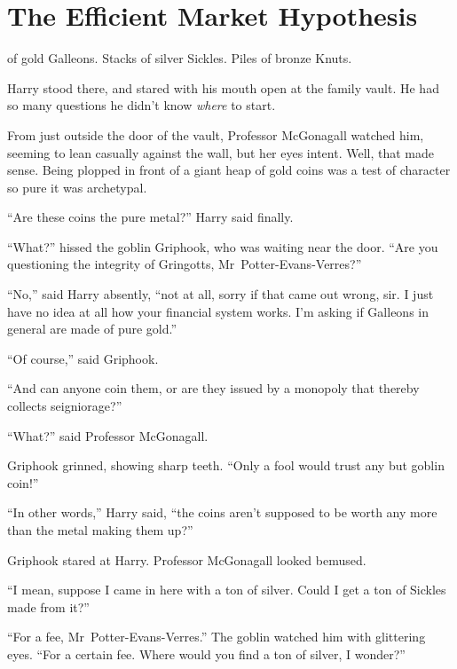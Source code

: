 \chapter[The Efficient Market Hypothesis]{The Efficient Market Hypothesis\protect\footnotemark}

 of gold Galleons. Stacks of silver Sickles. Piles of bronze Knuts.

\hplettrineextrapara
Harry stood there, and stared with his mouth open at the family vault. He had so many questions he didn’t know \emph{where} to start.

From just outside the door of the vault, Professor McGonagall watched him, seeming to lean casually against the wall, but her eyes intent. Well, that made sense. Being plopped in front of a giant heap of gold coins was a test of character so pure it was archetypal.

“Are these coins the pure metal?” Harry said finally.

“What?” hissed the goblin Griphook, who was waiting near the door. “Are you questioning the integrity of Gringotts, Mr~Potter-Evans-Verres?”

“No,” said Harry absently, “not at all, sorry if that came out wrong, sir. I just have no idea at all how your financial system works. I’m asking if Galleons in general are made of pure gold.”

“Of course,” said Griphook.

“And can anyone coin them, or are they issued by a monopoly that thereby collects seigniorage?”

“What?” said Professor McGonagall.

Griphook grinned, showing sharp teeth. “Only a fool would trust any but goblin coin!”

“In other words,” Harry said, “the coins aren’t supposed to be worth any more than the metal making them up?”

Griphook stared at Harry. Professor McGonagall looked bemused.

“I mean, suppose I came in here with a ton of silver. Could I get a ton of Sickles made from it?”

“For a fee, Mr~Potter-Evans-Verres.” The goblin watched him with glittering eyes. “For a certain fee. Where would you find a ton of silver, I wonder?”


